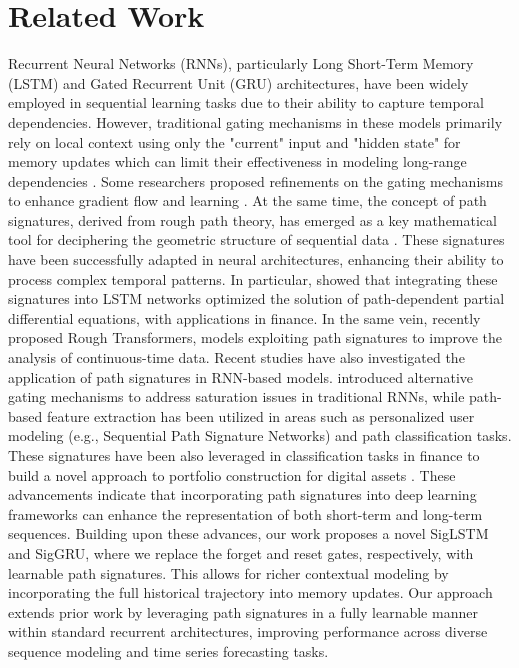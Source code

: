 \section{Related Work}
Recurrent Neural Networks (RNNs), particularly Long Short-Term Memory (LSTM) and Gated Recurrent Unit (GRU) architectures, have been widely employed in sequential learning tasks due to their ability to capture temporal dependencies. However, traditional gating mechanisms in these models primarily rely on local context using only the "current" input and "hidden state" for memory updates which can limit their effectiveness in modeling long-range dependencies \cite{gu2020improving}. Some researchers proposed refinements on the gating mechanisms to enhance gradient flow and learning \cite{lu2017simplified,gu2020improving,cheng2020refined}. At the same time, the concept of path signatures, derived from rough path theory, has emerged as a key mathematical tool for deciphering the geometric structure of sequential data \cite{lyons1998differential}. These signatures have been successfully adapted in neural architectures, enhancing their ability to process complex temporal patterns. In particular, \cite{sabate2020solving} showed that integrating these signatures into LSTM networks optimized the solution of path-dependent partial differential equations, with applications in finance. In the same vein, \cite{moreno2024rough} recently proposed Rough Transformers, models exploiting path signatures to improve the analysis of continuous-time data. Recent studies have also investigated the application of path signatures in RNN-based models. \cite{gu2020improving} introduced alternative gating mechanisms to address saturation issues in traditional RNNs, while path-based feature extraction has been utilized in areas such as personalized user modeling (e.g., Sequential Path Signature Networks) and path classification tasks. These signatures have been also leveraged in classification tasks in finance to build a novel approach to portfolio construction for digital assets \cite{inzirillo2024clustering}. These advancements indicate that incorporating path signatures into deep learning frameworks can enhance the representation of both short-term and long-term sequences.  Building upon these advances, our work proposes a novel SigLSTM and SigGRU, where we replace the forget and reset gates, respectively, with learnable path signatures. This allows for richer contextual modeling by incorporating the full historical trajectory into memory updates. Our approach extends prior work by leveraging path signatures in a fully learnable manner within standard recurrent architectures, improving performance across diverse sequence modeling and time series forecasting tasks.